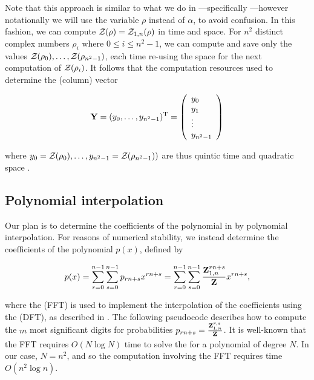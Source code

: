 Note that this approach is similar to what we do in \fftbor---specifically
---however notationally we will use the
variable $\rho$ instead of $\alpha$, to avoid confusion. In this fashion, we
can compute ${\mathcal Z}_{}(\rho)={\mathcal Z}_{1,n}(\rho)$ in
 time and  space. For $n^2$ distinct complex numbers
$\rho_i$ where $0 \leq i \leq n^2-1$, we can compute and save only the
values ${\mathcal Z}_{}(\rho_0),\dots,{\mathcal Z}_{}(\rho_{n^2-1})$, each time re-using the
 space for the next computation of ${\mathcal Z}_{}(\rho_i)$.
It follows that
the computation resources used to determine the (column) vector

\begin{align}
\label{eq:ffttwo:yColumn}
\bfY = (y_0,\dots,y_{n^2-1})^{\text T} =
\left(
\begin{array}{l}
y_0 \\
y_1 \\
\vdots \\
y_{n^2-1} \\
\end{array}
\right)
\end{align}

where $y_0={\mathcal Z}_{}(\rho_0),\dots,y_{n^2-1}={\mathcal Z}_{}(\rho_{n^2-1}))$ are thus
quintic time  and quadratic space .

\subsection{Polynomial interpolation}
Our plan is to determine the coefficients of the polynomial
\fullZx in  by
polynomial interpolation.  For reasons of numerical stability,
we instead determine the coefficients of the polynomial $p(x)$,
defined by

\begin{align}
\label{eq:ffttwo:pOfX}
p(x) =
\sum_{r=0}^{n-1} \sum_{s=0}^{n-1} p_{rn+s}
 x^{rn+s} =
\sum_{r=0}^{n-1} \sum_{s=0}^{n-1} \frac{\bfZ{rn+s}{1,n}}{\fullZ}
 x^{rn+s},
\end{align}

where the \fft (FFT) is used to implement the
interpolation of
the coefficients using the \idft (DFT), as
described in .  The following pseudocode
describes how
to compute the $m$ most significant digits
for probabilities
$p_{rn+s} = \frac{{\bf Z}^{r,s}_{1,n}}{{\bf Z}^{}_{}}$. It is well-known that
the FFT requires $O(N \log N)$ time to solve the \idft for a polynomial
of degree $N$. In our case,
$N=n^2$, and so the computation involving the FFT requires time $O(n^2 \log n)$.

